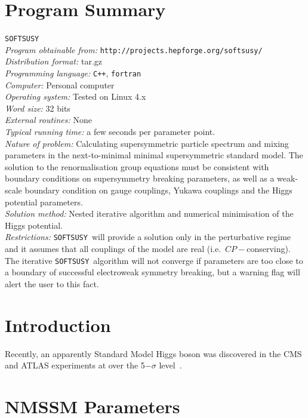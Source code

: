 \documentclass[final,3p,times,pdflatex]{elsarticle}
\def\SOFTSUSY{{\tt SOFTSUSY}\ }
\begin{document}
\section{Program Summary}
 \SOFTSUSY{}\\
{\em Program obtainable
  from:} {\tt http://projects.hepforge.org/softsusy/}\\
{\em Distribution format:}\/ tar.gz\\
{\em Programming language:} {\tt C++}, {\tt fortran}\\
{\em Computer:}\/ Personal computer\\
{\em Operating system:}\/ Tested on Linux 4.x\\
{\em Word size:}\/ 32 bits\\
{\em External routines:}\/ None\\
{\em Typical running time:}\/ a few seconds per parameter point.\\
{\em Nature of problem:}\/ Calculating supersymmetric particle spectrum and
mixing parameters in the next-to-minimal minimal supersymmetric standard
model. The solution to the renormalisation group equations must be consistent
with boundary conditions on supersymmetry breaking parameters, as
well as a weak-scale boundary condition on gauge 
couplings, Yukawa couplings and the Higgs potential parameters.\\
{\em Solution method:}\/ Nested iterative algorithm and numerical minimisation
of the Higgs potential. \\
{\em Restrictions:} \SOFTSUSY will provide a solution only in the
perturbative regime and it
assumes that all couplings of the model are real
(i.e.\ $CP-$conserving). The iterative \SOFTSUSY algorithm will not 
converge if parameters are too close to a boundary of successful electroweak
symmetry breaking, but a warning flag will alert the user to this fact.

\newpage

\section{Introduction}

Recently, an apparently Standard Model Higgs boson was discovered in the CMS
and ATLAS experiments at over the 5$-\sigma$ level~\cite{}. 

\section{NMSSM Parameters \label{sec:notation}}
\end{document}
